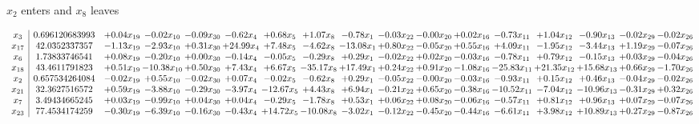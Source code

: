 \documentclass[9pt]{article}
\begin{document}
 $ x_{2} $ enters and $ x_{8} $ leaves 

 \[\begin{array}{c| c c@{\hskip 2pt} c@{\hskip 2pt} c@{\hskip 2pt} c@{\hskip 2pt} c@{\hskip 2pt} c@{\hskip 2pt} c@{\hskip 2pt} c@{\hskip 2pt} c@{\hskip 2pt} c@{\hskip 2pt} c@{\hskip 2pt} c@{\hskip 2pt} c@{\hskip 2pt} c@{\hskip 2pt} c@{\hskip 2pt} }
 x_{3}   &  0.696120683993 & +  0.04 x_{19} & -0.02 x_{10} & -0.09 x_{30} & -0.62 x_{4} & +  0.68 x_{5} & +  1.07 x_{8} & -0.78 x_{1} & -0.03 x_{22} & -0.00 x_{20} & +  0.02 x_{16} & -0.73 x_{11} & +  1.04 x_{12} & -0.90 x_{13} & -0.02 x_{29} & -0.02 x_{26}\\
 x_{17}   &  42.0352337357 & -1.13 x_{19} & -2.93 x_{10} & +  0.31 x_{30} & + 24.99 x_{4} & +  7.48 x_{5} & -4.62 x_{8} & -13.08 x_{1} & +  0.80 x_{22} & -0.05 x_{20} & +  0.55 x_{16} & +  4.09 x_{11} & -1.95 x_{12} & -3.44 x_{13} & +  1.19 x_{29} & -0.07 x_{26}\\
 x_{6}   &  1.73833746541 & +  0.08 x_{19} & -0.20 x_{10} & +  0.00 x_{30} & -0.14 x_{4} & -0.05 x_{5} & -0.29 x_{8} & +  0.29 x_{1} & -0.02 x_{22} & +  0.02 x_{20} & -0.03 x_{16} & -0.78 x_{11} & +  0.79 x_{12} & -0.15 x_{13} & +  0.03 x_{29} & -0.04 x_{26}\\
 x_{18}   &  43.4611791823 & +  0.51 x_{19} & -10.38 x_{10} & +  0.50 x_{30} & +  7.43 x_{4} & +  6.67 x_{5} & -35.17 x_{8} & + 17.49 x_{1} & +  0.24 x_{22} & +  0.91 x_{20} & -1.08 x_{16} & -25.83 x_{11} & + 21.35 x_{12} & + 15.68 x_{13} & +  0.66 x_{29} & -1.70 x_{26}\\
 x_{2}   &  0.657534264084 & -0.02 x_{19} & +  0.55 x_{10} & -0.02 x_{30} & +  0.07 x_{4} & -0.02 x_{5} & -0.62 x_{8} & +  0.29 x_{1} & -0.05 x_{22} & -0.00 x_{20} & -0.03 x_{16} & -0.93 x_{11} & +  0.15 x_{12} & +  0.46 x_{13} & -0.04 x_{29} & -0.02 x_{26}\\
 x_{21}   &  32.3627516572 & +  0.59 x_{19} & -3.88 x_{10} & -0.29 x_{30} & -3.97 x_{4} & -12.67 x_{5} & +  4.43 x_{8} & +  6.94 x_{1} & -0.21 x_{22} & +  0.65 x_{20} & -0.38 x_{16} & -10.52 x_{11} & -7.04 x_{12} & -10.96 x_{13} & -0.31 x_{29} & +  0.32 x_{26}\\
 x_{7}   &  3.49434665245 & +  0.03 x_{19} & -0.99 x_{10} & +  0.04 x_{30} & +  0.04 x_{4} & -0.29 x_{5} & -1.78 x_{8} & +  0.53 x_{1} & +  0.06 x_{22} & +  0.08 x_{20} & -0.06 x_{16} & -0.57 x_{11} & +  0.81 x_{12} & +  0.96 x_{13} & +  0.07 x_{29} & -0.07 x_{26}\\
 x_{23}   &  77.4534174259 & -0.30 x_{19} & -6.39 x_{10} & -0.16 x_{30} & -0.43 x_{4} & + 14.72 x_{5} & -10.08 x_{8} & -3.02 x_{1} & -0.12 x_{22} & -0.45 x_{20} & -0.44 x_{16} & -6.61 x_{11} & +  3.98 x_{12} & + 10.89 x_{13} & +  0.27 x_{29} & -0.87 x_{26}\\

\end{array}\]
\end{document}
